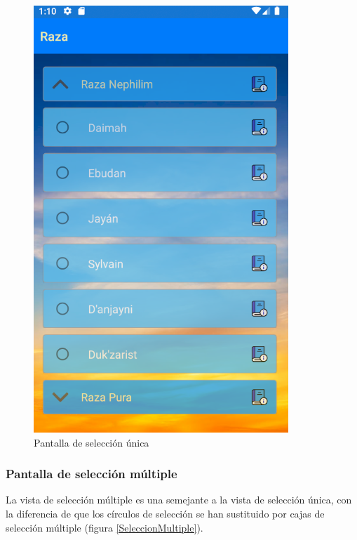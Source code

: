 \begin{figure}[H]
    \centering
    \includegraphics[scale=0.7]{Figures/Capturas/SeleccionUnicaGrupoAbierto.png}
    \caption{Pantalla de selección única}
    \label{SeleccionUnicaGrupoAbierto}    
\end{figure}

\subsubsection{Pantalla de selección múltiple}
La vista de selección múltiple es una semejante a la vista de selección única, con la diferencia de que los círculos de selección 
se han sustituido por cajas de selección múltiple (figura \ref*{SeleccionMultiple}).

